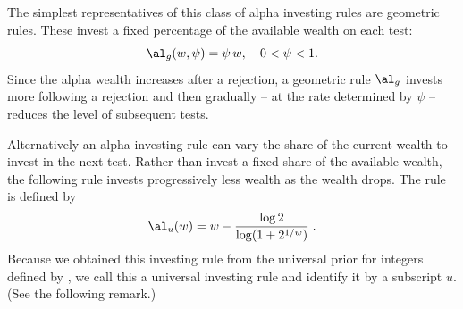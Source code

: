 \documentclass[12pt]{article}
\begin{document}


 The simplest representatives of this class of alpha investing rules are
 geometric rules.  These invest a fixed percentage of the available wealth on
 each test:
 \begin{equation}
    \al_g(w, \psi) = \psi \, w, \quad  0 < \psi < 1.
 \label{eq:Ageo}
 \end{equation}
 Since the alpha wealth increases after a rejection, a geometric rule $\al_g$
 invests more following a rejection and then gradually -- at the rate determined
 by $\psi$ -- reduces the level of subsequent tests.


 Alternatively an alpha investing rule can vary the share of the current wealth
 to invest in the next test.  Rather than invest a fixed share of the available
 wealth, the following rule invests progressively less wealth as the wealth
 drops.  The rule is defined by
 \begin{equation}
   \al_u(w) = w - \frac{\log 2}{\log(1+2^{1/w})} \;.   
 \label{eq:Auniv}
 \end{equation}
 Because we obtained this investing rule from the universal prior for integers
 defined by \citet{rissanen83}, we call this a universal investing rule and
 identify it by a subscript $u$.  (See the following remark.)
\end{document}
